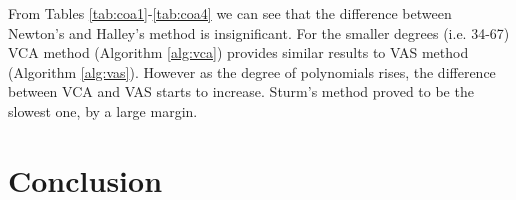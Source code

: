 \documentclass[
  digital, %
  notable,   %
  nolof,     %
  nolot,     %
	draft, %
]{fithesis3}
\begin{document}
\FloatBarrier
From Tables \ref{tab:coa1}-\ref{tab:coa4} we can see that the difference between Newton's and Halley's method is insignificant. For the smaller degrees (i.e. 34-67) VCA method (Algorithm \ref{alg:vca}) provides similar results to VAS method (Algorithm \ref{alg:vas}). However as the degree of polynomials rises, the difference between VCA and VAS starts to increase. Sturm's method proved to be the slowest one, by a large margin.

\chapter{Conclusion}



\printbibliography[heading=bibintoc]


  \makeatletter\thesis@blocks@clear\makeatother
  \printindex

\end{document}
